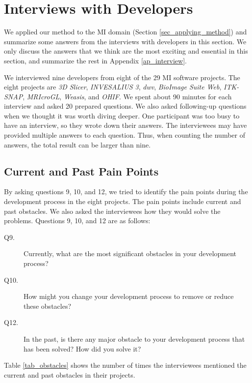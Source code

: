 \chapter{Interviews with Developers}
\label{ch_interview}

We applied our method to the MI domain (Section \ref{sec_applying_method}) and summarize some answers from the interviews with developers in this section. We only discuss the answers that we think are the most exciting and essential in this section, and summarize the rest in Appendix \ref{ap_interview}.

We interviewed nine developers from eight of the 29 MI software projects. The eight projects are \textit{3D Slicer}, \textit{INVESALIUS 3}, \textit{dwv}, \textit{BioImage Suite Web}, \textit{ITK-SNAP}, \textit{MRIcroGL}, \textit{Weasis}, and \textit{OHIF}. We spent about 90 minutes for each interview and asked 20 prepared questions. We also asked following-up questions when we thought it was worth diving deeper. One participant was too busy to have an interview, so they wrote down their answers. The interviewees may have provided multiple answers to each question. Thus, when counting the number of answers, the total result can be larger than nine.

\section{Current and Past Pain Points}
\label{sec_interview_pain_points}

By asking questions 9, 10, and 12, we tried to identify the pain points during the development process in the eight projects. The pain points include current and past obstacles. We also asked the interviewees how they would solve the problems. Questions 9, 10, and 12 are as follows:

\begin{description}
\item[Q9.] Currently, what are the most significant obstacles in your development process?
\item[Q10.] How might you change your development process to remove or reduce these obstacles?
\item[Q12.] In the past, is there any major obstacle to your development process that has been solved? How did you solve it?
\end{description}

Table \ref{tab_obstacles} shows the number of times the interviewees mentioned the current and past obstacles in their projects.

